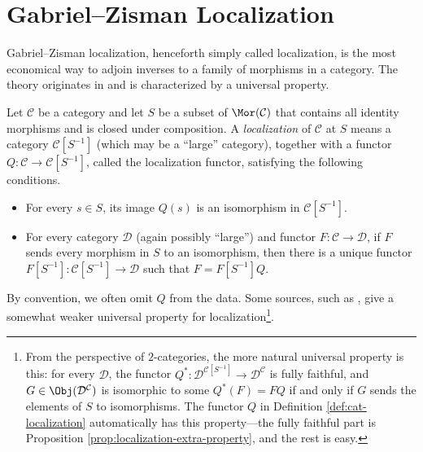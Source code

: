 
\section{Gabriel--Zisman Localization}\label{sec:cat-localization}
\hypertarget{o014.aljabr2.chapter1.gabriel-zisman-localization}{ }

Gabriel--Zisman localization, henceforth simply called localization, is the
most economical way to adjoin inverses to a family of morphisms in a category.
The theory originates in \cite{GZ67} and is characterized by a universal
property.

\begin{definition}\label{def:cat-localization}
	Let $\mathcal{C}$ be a category and let $S$ be a subset of
	$\Mor(\mathcal{C})$ that contains all identity morphisms and is closed
	under composition. A \emph{localization} of $\mathcal{C}$ at $S$ means a
	category $\mathcal{C}[S^{-1}]$ (which may be a ``large'' category), together
	with a functor $Q:\mathcal{C}\to\mathcal{C}[S^{-1}]$, called the
	localization functor, satisfying the following conditions.
	\begin{itemize}
		\item For every $s\in S$, its image $Q(s)$ is an isomorphism in
		$\mathcal{C}[S^{-1}]$.
		\item For every category $\mathcal{D}$ (again possibly ``large'') and
		functor $F:\mathcal{C}\to\mathcal{D}$, if $F$ sends every morphism in
		$S$ to an isomorphism, then there is a unique functor
		$F[S^{-1}]:\mathcal{C}[S^{-1}]\to\mathcal{D}$ such that
		$F=F[S^{-1}]Q$.
	\end{itemize}
\end{definition}

By convention, we often omit $Q$ from the data. Some sources, such as
\cite[Definition 7.1.1]{KS06}, give a somewhat weaker universal property for
localization\footnote{From the perspective of $2$-categories, the more natural
universal property is this: for every $\mathcal{D}$, the functor
$Q^*:\mathcal{D}^{\mathcal{C}[S^{-1}]}\to\mathcal{D}^{\mathcal{C}}$ is fully
faithful, and $G\in\Obj(\mathcal{D}^{\mathcal{C}})$ is isomorphic to some
$Q^*(F)=FQ$ if and only if $G$ sends the elements of $S$ to isomorphisms. The
functor $Q$ in Definition \ref{def:cat-localization} automatically has this
property---the fully faithful part is Proposition
\ref{prop:localization-extra-property}, and the rest is easy.}.

